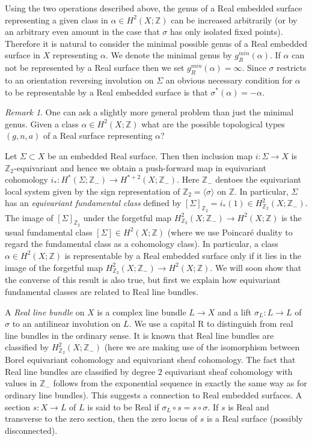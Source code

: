 \documentclass{amsart}
\theoremstyle{definition}
\theoremstyle{remark}
\newtheorem{remark}[theorem]{Remark}
\numberwithin{equation}{section}
\begin{document}
Using the two operations described above, the genus of a Real embedded surface representing a given class in $\alpha \in H^2(X ; \mathbb{Z})$ can be increased arbitrarily (or by an arbitrary even amount in the case that $\sigma$ has only isolated fixed points). Therefore it is natural to consider the minimal possible genus of a Real embedded surface in $X$ representing $\alpha$. We denote the minimal genus by $g^{min}_R(\alpha)$. If $\alpha$ can not be represented by a Real surface then we set $g^{min}_R(\alpha) = \infty$. Since $\sigma$ restricts to an orientation reversing involution on $\Sigma$ an obvious necessary condition for $\alpha$ to be representable by a Real embedded surface is that $\sigma^*(\alpha) = -\alpha$.

\begin{remark}
One can ask a slightly more general problem than just the minimal genus. Given a class $\alpha \in H^2(X ; \mathbb{Z})$ what are the possible topological types $(g,n,a)$ of a Real surface representing $\alpha$?
\end{remark}

Let $\Sigma \subset X$ be an embedded Real surface. Then then inclusion map $i : \Sigma \to X$ is $\mathbb{Z}_2$-equivariant and hence we obtain a push-forward map in equivariant cohomology $i_* : H^*(\Sigma ; \mathbb{Z}_-) \to H^{*+2}(X ; \mathbb{Z}_-)$. Here $\mathbb{Z}_-$ dentoes the equivariant local system given by the sign representation of $\mathbb{Z}_2 = \langle \sigma \rangle$ on $\mathbb{Z}$. In particular, $\Sigma$ has an {\em equivariant fundamental class} defined by $[\Sigma]_{\mathbb{Z}_2} = i_*(1) \in H^2_{\mathbb{Z}_2}(X ; \mathbb{Z}_-)$. The image of $[\Sigma]_{\mathbb{Z}_2}$ under the forgetful map $H^2_{\mathbb{Z}_2}(X ; \mathbb{Z}_-) \to H^2(X ; \mathbb{Z})$ is the usual fundamental class $[\Sigma] \in H^2(X ; \mathbb{Z})$ (where we use Poincar\'e duality to regard the fundamental class as a cohomology class). In particular, a class $\alpha \in H^2(X ; \mathbb{Z})$ is representable by a Real embedded surface only if it lies in the image of the forgetful map $H^2_{\mathbb{Z}_2}(X ; \mathbb{Z}_-) \to H^2(X ; \mathbb{Z})$. We will soon show that the converse of this result is also true, but first we explain how equivariant fundamental classes are related to Real line bundles.

A {\em Real line bundle} on $X$ is a complex line bundle $L \to X$ and a lift $\sigma_L : L \to L$ of $\sigma$ to an antilinear involution on $L$. We use a capital R to distinguish from real line bundles in the ordinary sense. It is known that Real line bundles are classified by $H^2_{\mathbb{Z}_2}(X ; \mathbb{Z}_-)$ (here we are making use of the isomorphism \cite{sti} between Borel equivariant cohomology and equivariant sheaf cohomology. The fact that Real line bundles are classified by degree $2$ equivariant sheaf cohomology with values in $\mathbb{Z}_-$ follows from the exponential sequence in exactly the same way as for ordinary line bundles). This suggests a connection to Real embedded surfaces. A section $s : X \to L$ of $L$ is said to be Real if $\sigma_L \circ s = s \circ \sigma$. If $s$ is Real and transverse to the zero section, then the zero locus of $s$ is a Real surface (possibly disconnected).
\end{document}
